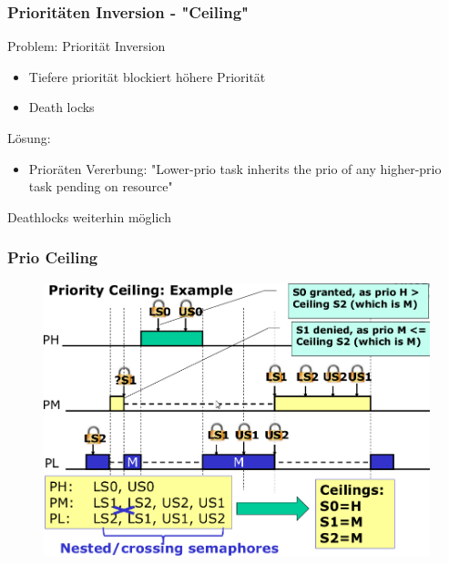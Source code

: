 %
%
\begin{frame}
  \frametitle{Prioritäten Inversion - "Ceiling"}
  Problem: Priorität Inversion
	\begin{itemize}
	  \item Tiefere priorität blockiert höhere Priorität
	  \item Death locks
	\end{itemize}
	Lösung:
  \begin{itemize}
	  \item Prioräten Vererbung: "Lower-prio task inherits the prio of any higher-prio task pending on resource"
	\end{itemize}
	\bigskip
	Deathlocks weiterhin möglich
\end{frame}

\begin{frame}
  \frametitle{Prio Ceiling}
  \begin{figure}
  \includegraphics[scale=0.3]{pic/02_sem/sem_02.png} 
  \end{figure}
\end{frame}